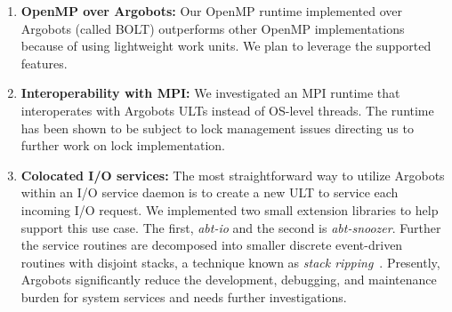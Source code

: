 \begin{enumerate}

\item \textbf{OpenMP over Argobots:} Our OpenMP runtime implemented
  over Argobots (called BOLT) outperforms other OpenMP implementations
  because of using lightweight work units. We plan to leverage the
  supported features.

\item \textbf{Interoperability with MPI:} We investigated an MPI
  runtime that interoperates with Argobots ULTs instead of OS-level
  threads. The runtime has been shown to be subject to lock management
  issues directing us to further work on lock implementation.

\item \textbf{Colocated I/O services:} The most straightforward way to
  utilize Argobots within an I/O service daemon is to create a new ULT
  to service each incoming I/O request.  We implemented two small
  extension libraries to help support this use case.  The first,
  \emph{abt-io} and the second is \emph{abt-snoozer}. Further the
  service routines are decomposed into smaller discrete event-driven
  routines with disjoint stacks, a technique known as \emph{stack
    ripping}~\cite{ATC02_Adya}.  Presently, Argobots significantly
  reduce the development, debugging, and maintenance burden for system
  services and needs further investigations.

\end{enumerate}
